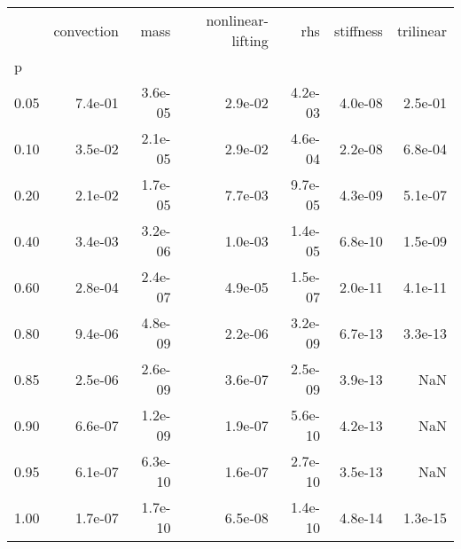 \begin{tabular}{lrrrrrr}
\toprule
{} &  convection &    mass &  nonlinear-lifting &     rhs &  stiffness &  trilinear \\
p    &             &         &                    &         &            &            \\
\midrule
0.05 &     7.4e-01 & 3.6e-05 &            2.9e-02 & 4.2e-03 &    4.0e-08 &    2.5e-01 \\
0.10 &     3.5e-02 & 2.1e-05 &            2.9e-02 & 4.6e-04 &    2.2e-08 &    6.8e-04 \\
0.20 &     2.1e-02 & 1.7e-05 &            7.7e-03 & 9.7e-05 &    4.3e-09 &    5.1e-07 \\
0.40 &     3.4e-03 & 3.2e-06 &            1.0e-03 & 1.4e-05 &    6.8e-10 &    1.5e-09 \\
0.60 &     2.8e-04 & 2.4e-07 &            4.9e-05 & 1.5e-07 &    2.0e-11 &    4.1e-11 \\
0.80 &     9.4e-06 & 4.8e-09 &            2.2e-06 & 3.2e-09 &    6.7e-13 &    3.3e-13 \\
0.85 &     2.5e-06 & 2.6e-09 &            3.6e-07 & 2.5e-09 &    3.9e-13 &        NaN \\
0.90 &     6.6e-07 & 1.2e-09 &            1.9e-07 & 5.6e-10 &    4.2e-13 &        NaN \\
0.95 &     6.1e-07 & 6.3e-10 &            1.6e-07 & 2.7e-10 &    3.5e-13 &        NaN \\
1.00 &     1.7e-07 & 1.7e-10 &            6.5e-08 & 1.4e-10 &    4.8e-14 &    1.3e-15 \\
\bottomrule
\end{tabular}
